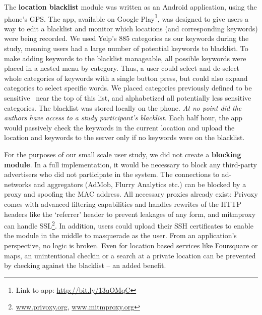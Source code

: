 The \textbf{location blacklist} module was written as an Android application, using the phone's GPS. 
The app, available on Google Play\footnote{Link to app: \url{http://bit.ly/13qOMqC}}, was designed to give users a way to edit a blacklist and monitor which locations (and corresponding keywords) were being recorded. 
We used Yelp's 885 categories as our keywords during the study, meaning users had a large number of potential keywords to blacklist.
To make adding keywords to the blacklist manageable, all possible keywords were placed in a nested menu by category. 
Thus, a user could select and de-select whole categories of keywords with a single button press, but could also expand categories to select specific words.
We placed categories previously defined to be sensitive~\cite{bing} near the top of this list, and alphabetized all potentially less sensitive categories.
The blacklist was stored locally on the phone. 
\emph{At no point did the authors have access to a study participant's blacklist.}
Each half hour, the app would passively check the keywords in the current location and upload the location and keywords to the server only if no keywords were on the blacklist.

For the purposes of our small scale user study, we did not create a \textbf{blocking module}.
In a full implementation, it would be necessary to block any third-party advertisers who did not participate in the system.
The connections to ad-networks and aggregators (AdMob, Flurry Analytics etc.) can be blocked by a proxy and spoofing the MAC address. 
All necessary proxies already exist: Privoxy comes with advanced filtering capabilities and handles rewrites of the HTTP headers like the `referrer' header to prevent leakages of any form, and mitmproxy can handle SSL\footnote{\url{www.privoxy.org}, \url{www.mitmproxy.org}}. 
In addition, users could upload their SSH certificates to enable the module in the middle to masquerade as the user. 
From an application's perspective, no logic is broken. 
Even for location based services like Foursquare or maps, an unintentional checkin or a search at a private location can be prevented by checking against the blacklist -- an added benefit.  

